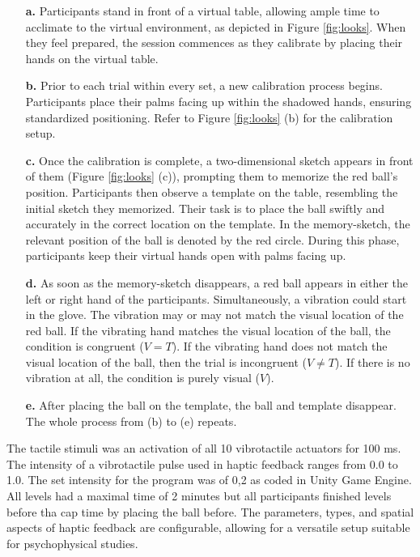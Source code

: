 \documentclass[12pt,oneside,openright]{report}
\begin{document}
\begin{enumerate}
    \item[\textbf{a.}] Participants stand in front of a virtual table, allowing ample time to acclimate to the virtual environment, as depicted in Figure \ref{fig:looks}. When they feel prepared, the session commences as they calibrate by placing their hands on the virtual table.

    \item[\textbf{b.}] Prior to each trial within every set, a new calibration process begins. Participants place their palms facing up within the shadowed hands, ensuring standardized positioning. Refer to Figure \ref{fig:looks} (b) for the calibration setup.
    
    \item[\textbf{c.}] Once the calibration is complete, a two-dimensional sketch appears in front of them (Figure \ref{fig:looks} (c)), prompting them to memorize the red ball's position. Participants then observe a template on the table, resembling the initial sketch they memorized. Their task is to place the ball swiftly and accurately in the correct location on the template. In the memory-sketch, the relevant position of the ball is denoted by the red circle. During this phase, participants keep their virtual hands open with palms facing up.
    
    \item[\textbf{d.}] As soon as the memory-sketch disappears, a red ball appears in either the left or right hand of the participants. Simultaneously, a vibration could start in the glove. The vibration may or may not match the visual location of the red ball. If the vibrating hand matches the visual location of the ball, the condition is congruent ($V=T$). If the vibrating hand does not match the visual location of the ball, then the trial is incongruent ($V \neq T$). If there is no vibration at all, the condition is purely visual ($V$).
   
    \item[\textbf{e.}] After placing the ball on the template, the ball and template disappear. The whole process from (b) to (e) repeats.
\end{enumerate}

The tactile stimuli was an activation of all 10 vibrotactile actuators for 100 ms. The intensity of a vibrotactile pulse used in haptic feedback ranges from 0.0 to 1.0. The set intensity for the program was of 0,2 as coded in Unity Game Engine. All levels had a maximal time of 2 minutes but all participants finished levels before tha cap time by placing the ball before. The parameters, types, and spatial aspects of haptic feedback are configurable, allowing for a versatile setup suitable for psychophysical studies.
\end{document}
